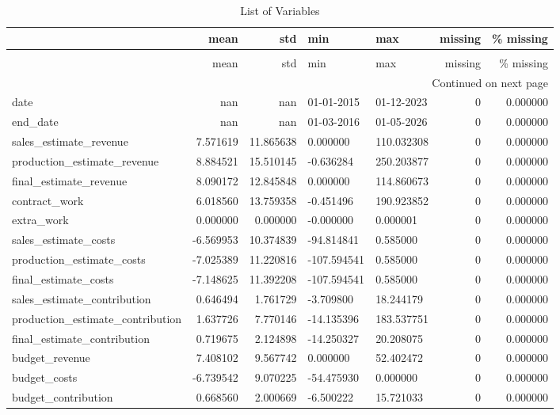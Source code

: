 \begin{landscape}\begin{longtable}[h!]{lrrllrr}
\caption{List of Variables} \label{eda_1} \\
\toprule
 & mean & std & min & max & missing & \% missing \\
\midrule
\endfirsthead
\caption[]{List of Variables} \\
\toprule
 & mean & std & min & max & missing & \% missing \\
\midrule
\endhead
\midrule
\multicolumn{7}{r}{Continued on next page} \\
\midrule
\endfoot
\bottomrule
\endlastfoot
date & nan & nan & 01-01-2015 & 01-12-2023 & 0 & 0.000000 \\
end_date & nan & nan & 01-03-2016 & 01-05-2026 & 0 & 0.000000 \\
sales_estimate_revenue & 7.571619 & 11.865638 & 0.000000 & 110.032308 & 0 & 0.000000 \\
production_estimate_revenue & 8.884521 & 15.510145 & -0.636284 & 250.203877 & 0 & 0.000000 \\
final_estimate_revenue & 8.090172 & 12.845848 & 0.000000 & 114.860673 & 0 & 0.000000 \\
contract_work & 6.018560 & 13.759358 & -0.451496 & 190.923852 & 0 & 0.000000 \\
extra_work & 0.000000 & 0.000000 & -0.000000 & 0.000001 & 0 & 0.000000 \\
sales_estimate_costs & -6.569953 & 10.374839 & -94.814841 & 0.585000 & 0 & 0.000000 \\
production_estimate_costs & -7.025389 & 11.220816 & -107.594541 & 0.585000 & 0 & 0.000000 \\
final_estimate_costs & -7.148625 & 11.392208 & -107.594541 & 0.585000 & 0 & 0.000000 \\
sales_estimate_contribution & 0.646494 & 1.761729 & -3.709800 & 18.244179 & 0 & 0.000000 \\
production_estimate_contribution & 1.637726 & 7.770146 & -14.135396 & 183.537751 & 0 & 0.000000 \\
final_estimate_contribution & 0.719675 & 2.124898 & -14.250327 & 20.208075 & 0 & 0.000000 \\
budget_revenue & 7.408102 & 9.567742 & 0.000000 & 52.402472 & 0 & 0.000000 \\
budget_costs & -6.739542 & 9.070225 & -54.475930 & 0.000000 & 0 & 0.000000 \\
budget_contribution & 0.668560 & 2.000669 & -6.500222 & 15.721033 & 0 & 0.000000 \\

\end{longtable}
\end{landscape}
